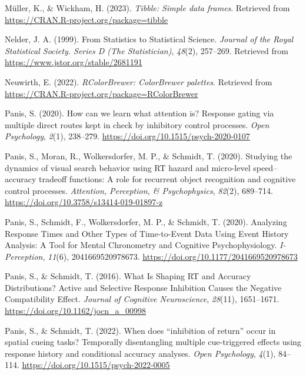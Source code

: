 \documentclass[
  english,
  man, donotrepeattitle,floatsintext]{apa6}
\newlength{\cslhangindent}
\newenvironment{CSLReferences}[2] %
 {\begin{list}{}{%
  \setlength{\itemindent}{0pt}
  \setlength{\leftmargin}{0pt}
  \setlength{\parsep}{0pt}
  \ifodd #1
   \setlength{\leftmargin}{\cslhangindent}
   \setlength{\itemindent}{-1\cslhangindent}
  \fi
  \setlength{\itemsep}{#2\baselineskip}}}
 {\end{list}}
\begin{document}
\begin{CSLReferences}{1}{0}
Müller, K., \& Wickham, H. (2023). \emph{Tibble: Simple data frames}. Retrieved from \url{https://CRAN.R-project.org/package=tibble}

Nelder, J. A. (1999). From {Statistics} to {Statistical Science}. \emph{Journal of the Royal Statistical Society. Series D (The Statistician)}, \emph{48}(2), 257--269. Retrieved from \url{https://www.jstor.org/stable/2681191}

Neuwirth, E. (2022). \emph{RColorBrewer: ColorBrewer palettes}. Retrieved from \url{https://CRAN.R-project.org/package=RColorBrewer}

Panis, S. (2020). How can we learn what attention is? {Response} gating via multiple direct routes kept in check by inhibitory control processes. \emph{Open Psychology}, \emph{2}(1), 238--279. \url{https://doi.org/10.1515/psych-2020-0107}

Panis, S., Moran, R., Wolkersdorfer, M. P., \& Schmidt, T. (2020). Studying the dynamics of visual search behavior using {RT} hazard and micro-level speed--accuracy tradeoff functions: {A} role for recurrent object recognition and cognitive control processes. \emph{Attention, Perception, \& Psychophysics}, \emph{82}(2), 689--714. \url{https://doi.org/10.3758/s13414-019-01897-z}

Panis, S., Schmidt, F., Wolkersdorfer, M. P., \& Schmidt, T. (2020). Analyzing {Response Times} and {Other Types} of {Time-to-Event Data Using Event History Analysis}: {A Tool} for {Mental Chronometry} and {Cognitive Psychophysiology}. \emph{I-Perception}, \emph{11}(6), 2041669520978673. \url{https://doi.org/10.1177/2041669520978673}

Panis, S., \& Schmidt, T. (2016). What {Is Shaping RT} and {Accuracy Distributions}? {Active} and {Selective Response Inhibition Causes} the {Negative Compatibility Effect}. \emph{Journal of Cognitive Neuroscience}, \emph{28}(11), 1651--1671. \url{https://doi.org/10.1162/jocn_a_00998}

Panis, S., \& Schmidt, T. (2022). When does {``inhibition of return''} occur in spatial cueing tasks? {Temporally} disentangling multiple cue-triggered effects using response history and conditional accuracy analyses. \emph{Open Psychology}, \emph{4}(1), 84--114. \url{https://doi.org/10.1515/psych-2022-0005}


\end{CSLReferences}
\end{document}
